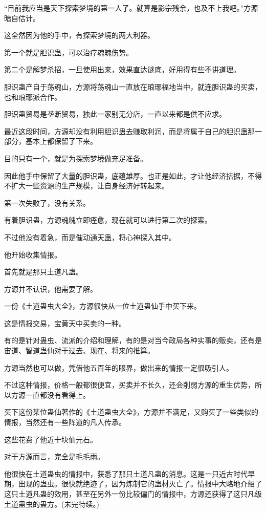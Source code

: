 \begin{this_body}
“目前我应当是天下探索梦境的第一人了。就算是影宗残余，也及不上我吧。”方源暗自估计。

这全然因为他的手中，有探索梦境的两大利器。

第一个就是胆识蛊，可以治疗魂魄伤势。

第二个是解梦杀招，一旦使用出来，效果直达谜底，好用得有些不讲道理。

胆识蛊产自于荡魂山，方源将荡魂山一直放在琅琊福地当中，就连胆识蛊的买卖，也和琅琊派合作。

胆识蛊贸易是垄断贸易，独此一家别无分店，一直以来都是供不应求。

最近这段时间，方源却没有利用胆识蛊去赚取利润，而是将属于自己的胆识蛊那一部分，基本上都保留了下来。

目的只有一个，就是为探索梦境做充足准备。

因此他手中保留了大量的胆识蛊，底蕴雄厚。也正是如此，才让他经济拮据，不得不扩大一些资源的生产规模，让自身经济好转起来。

第一次失败了，没有关系。

有着胆识蛊，方源魂魄立即痊愈，现在就可以进行第二次的探索。

不过他没有着急，而是催动通天蛊，将心神探入其中。

他开始收集情报。

首先就是那只土道凡蛊。

方源并不认识，他需要了解。

一份《土道蛊虫大全》，方源很快从一位土道蛊仙手中买下来。

这是情报交易，宝黄天中买卖的一种。

有的是针对蛊虫、流派的介绍和理解，有的是对当今政局各种实事的贩卖，还有是宙道、智道蛊仙对于过去、现在、将来的推算。

方源当然也可以做，凭借他五百年的眼界，做出来的情报一定很吸引人。

不过这种情报，价格一般都很便宜，买卖并不长久，还会削弱方源的重生优势，所以方源一直都没有看得上。

买下这份某位蛊仙著作的《土道蛊虫大全》，方源并不满足，又购买了一些类似的情报，当然还有一些阵道的凡人传承。

这些花费了他近十块仙元石。

对于方源而言，完全是毛毛雨。

他很快在土道蛊虫的情报中，获悉了那只土道凡蛊的消息。这是一只近古时代早期，出现的蛊虫。很快就绝迹了，因为炼制它的蛊材灭亡了。情报中大略地介绍了这只土道凡蛊的效用，甚至在另外一份比较偏门的情报中，方源还获得了这只凡级土道蛊虫的蛊方。(未完待续。)

\end{this_body}

